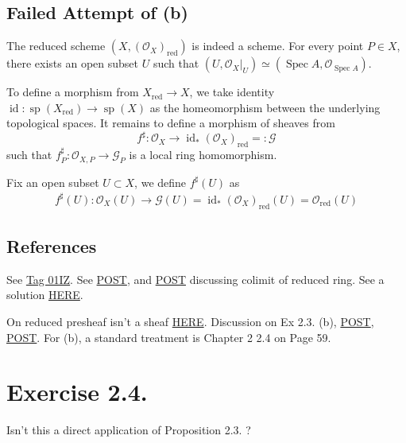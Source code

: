 \subsection{Failed Attempt of (b)}
The reduced scheme $(X,(\mathcal O_X)_{\text{red}})$ is indeed a scheme. For every point $P\in X$, there exists an open subset $U$ such that $(U,\mathcal O_X\vert_U)\simeq (\operatorname{Spec}A,\mathcal O_{\operatorname{Spec}A})$.

To define a morphism from $X_{\text{red}}\to X$, we take identity $\operatorname{id}:\operatorname{sp}(X_{\text{red}})\to\operatorname{sp}(X)$ as the homeomorphism between the underlying topological spaces. It remains to define a morphism of sheaves from 
\[f^{\sharp}:\mathcal O_X\to\operatorname{id}_{\ast}(\mathcal O_X)_{\text{red}}=:\mathcal G\] such that $f^{\sharp}_P:\mathcal O_{X,P}\to \mathcal G_P$ is a local ring homomorphism. 

Fix an open subset $U\subset X$, we define $f^{\sharp}(U)$ as 
\begin{align*}
    f^{\sharp}(U):\mathcal O_X(U)\to\mathcal G(U)=\operatorname{id}_{\ast}(\mathcal O_X)_{\text{red}}(U)=\mathcal O_{\text{red}}(U)
\end{align*}

\subsection{References}
See \href{https://stacks.math.columbia.edu/tag/01IZ}{Tag 01IZ}. See \href{https://math.stackexchange.com/questions/437227/colimit-of-reduced-rings}{POST}, and \href{https://math.stackexchange.com/questions/2737301/reducedness-and-colimit}{POST} discussing colimit of reduced ring. See a solution \href{https://www.math.ncku.edu.tw/~fjmliou/alg/reduced_scheme.pdf}{HERE}.

On reduced presheaf isn't a sheaf \href{https://math.stackexchange.com/questions/338185/the-reduced-presheaf}{HERE}. Discussion on Ex 2.3. (b), \href{https://math.stackexchange.com/questions/682230/exercise-2-3-from-hartshornes-algebraic-geometry}{POST}, \href{https://math.stackexchange.com/questions/441031/reduced-schemes-and-global-sections}{POST}. For (b), a standard treatment is \cite{qing2006algebraic} Chapter 2 2.4 on Page 59.

\section{Exercise 2.4.}

Isn't this a direct application of Proposition 2.3. \cite{hartshorne2013algebraic}? 

